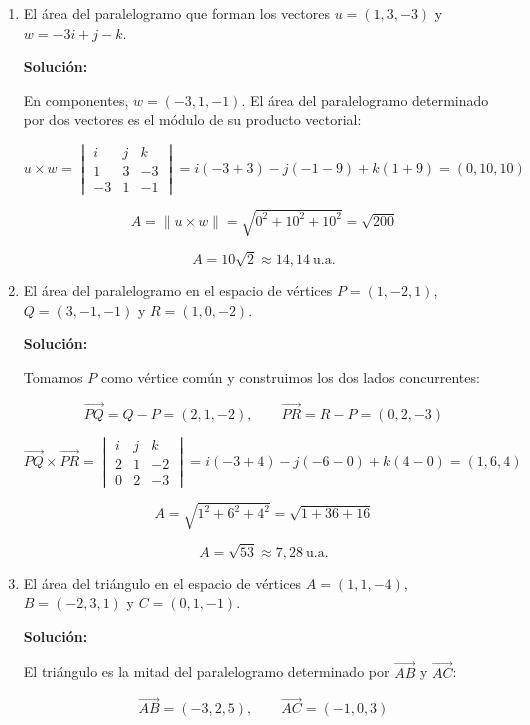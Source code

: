 \documentclass[12pt]{article}
\newcommand{\solucion}{%
    \vspace{0.8em}%
    \textbf{Solución:}%
    \vspace{0.8em}%
}
\begin{document}
\begin{enumerate}[label=\alph*.-]

    \item El área del paralelogramo que forman los vectores $u=(1,3,-3)$ y
    $w=-3i+j-k$.

    \solucion

    En componentes, $w=(-3,1,-1)$. El área del paralelogramo determinado por
    dos vectores es el módulo de su producto vectorial:

    \[
    u\times w=\begin{vmatrix}
    i & j & k\\
    1 & 3 & -3\\
    -3 & 1 & -1
    \end{vmatrix}
    =i(-3+3)-j(-1-9)+k(1+9)=(0,10,10)
    \]

    \[
    A=\|u\times w\|=\sqrt{0^2+10^2+10^2}=\sqrt{200}
    \]

    \[
    \boxed{A=10\sqrt{2}\approx14{,}14\ \text{u.a.}}
    \]

    \item El área del paralelogramo en el espacio de vértices
    $P=(1,-2,1)$, $Q=(3,-1,-1)$ y $R=(1,0,-2)$.

    \solucion

    Tomamos $P$ como vértice común y construimos los dos lados concurrentes:

    \[
    \overrightarrow{PQ}=Q-P=(2,1,-2),\qquad
    \overrightarrow{PR}=R-P=(0,2,-3)
    \]

    \[
    \overrightarrow{PQ}\times\overrightarrow{PR}=\begin{vmatrix}
    i & j & k\\
    2 & 1 & -2\\
    0 & 2 & -3
    \end{vmatrix}
    =i(-3+4)-j(-6-0)+k(4-0)=(1,6,4)
    \]

    \[
    A=\sqrt{1^2+6^2+4^2}=\sqrt{1+36+16}
    \]

    \[
    \boxed{A=\sqrt{53}\approx7{,}28\ \text{u.a.}}
    \]

    \item El área del triángulo en el espacio de vértices $A=(1,1,-4)$,
    $B=(-2,3,1)$ y $C=(0,1,-1)$.

    \solucion

    El triángulo es la mitad del paralelogramo determinado por
    $\overrightarrow{AB}$ y $\overrightarrow{AC}$:

    \[
    \overrightarrow{AB}=(-3,2,5),\qquad \overrightarrow{AC}=(-1,0,3)
    \]


\end{enumerate}
\end{document}
